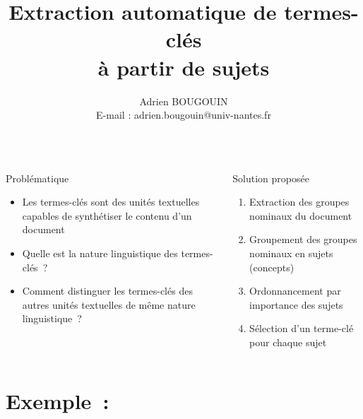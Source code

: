 \documentclass[final, xcolor={usenames, dvipsnames}]{beamer}
\title{\Huge\textbf
  Extraction automatique de termes-clés\\à partir de sujets
}
\author{
  Adrien BOUGOUIN\\
  E-mail : adrien.bougouin@univ-nantes.fr
}
\institute{%
  Spécialité : Informatique\\ %
  Laboratoire : LINA\\        %
  \'{E}quipe : TALN           %
}
\begin{document}
  \begin{frame}[b]{}
    \begin{columns}[t]
      \begin{column}{.45\linewidth}
        \begin{block}{Problématique}
          \begin{itemize}
            \item{Les termes-clés sont des unités textuelles capables de
                  synthétiser le contenu d'un document}
            \item{Quelle est la nature linguistique des termes-clés~?}
            \item{Comment distinguer les termes-clés des autres unités
                  textuelles de même nature linguistique~?}
          \end{itemize}
        \end{block}
      \end{column}

      \begin{column}{.45\linewidth}
        \begin{block}{Solution proposée}
          \vspace{.55em}
          \begin{enumerate}
            \item{Extraction des groupes nominaux du document}
            \item{Groupement des groupes nominaux en sujets (concepts)}
            \item{Ordonnancement par importance des sujets}
            \item{Sélection d'un terme-clé pour chaque sujet}
          \end{enumerate}
          \vspace{.59em}
        \end{block}
      \end{column}
    \end{columns}

    \vspace{-1em}

    \begin{columns}[b]
      \begin{column}{.45\linewidth}
        \section{Exemple~:}


\end{column}
\end{columns}
\end{frame}
\end{document}
